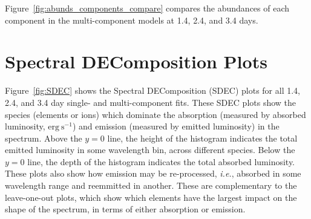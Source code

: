 \documentclass[twocolumn,twocolappendix]{aastex63}
\def\ie{{\it i.e.}}
\begin{document}
Figure~\ref{fig:abunds_components_compare} compares the abundances of each component in the multi-component models at 1.4, 2.4, and 3.4 days.










\section{Spectral DEComposition Plots}\label{app:SDEC}

Figure~\ref{fig:SDEC} shows the Spectral DEComposition (SDEC) plots for all 1.4, 2.4, and 3.4 day single- and multi-component fits. These SDEC plots show the species (elements or ions) which dominate the absorption (measured by absorbed luminosity, $\mathrm{erg~s^{-1}}$) and emission (measured by emitted luminosity) in the spectrum. Above the $y = 0$ line, the height of the histogram indicates the total emitted luminosity in some wavelength bin, across different species. Below the $y = 0$ line, the depth of the histogram indicates the total absorbed luminosity. These plots also show how emission may be re-processed, \ie, absorbed in some wavelength range and reemmitted in another. These are complementary to the leave-one-out plots, which show which elements have the largest impact on the shape of the spectrum, in terms of either absorption or emission.
\end{document}
